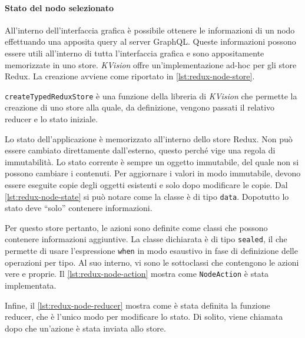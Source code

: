 \paragraph{Stato del nodo selezionato}
All'interno dell'interfaccia grafica è possibile ottenere le informazioni di un nodo effettuando una apposita query al server GraphQL. Queste informazioni possono essere utili all'interno di tutta l'interfaccia grafica e sono appositamente memorizzate in uno store. \textit{KVision} offre un'implementazione ad-hoc per gli store Redux. La creazione avviene come riportato in \cref{lst:redux-node-store}.

\texttt{createTypedReduxStore} è una funzione della libreria di \textit{KVision} che permette la creazione di uno store alla quale, da definizione, vengono passati il relativo reducer e lo stato iniziale.

Lo stato dell'applicazione è memorizzato all'interno dello store Redux. Non può essere cambiato direttamente dall'esterno, questo perché vige una regola di immutabilità. Lo stato corrente è sempre un oggetto immutabile, del quale non si possono cambiare i contenuti. Per aggiornare i valori in modo immutabile, devono essere eseguite copie degli oggetti esistenti e solo dopo modificare le copie. Dal \cref{lst:redux-node-state} si può notare come la classe è di tipo \texttt{data}. Dopotutto lo stato deve ``solo'' contenere informazioni.



Per questo store pertanto, le azioni sono definite come classi che possono contenere informazioni aggiuntive. La classe dichiarata è di tipo \texttt{sealed}, il che permette di usare l'espressione \texttt{when} in modo esaustivo in fase di definizione delle operazioni per tipo. Al suo interno, vi sono le sottoclassi che contengono le azioni vere e proprie. Il \cref{lst:redux-node-action} mostra come \texttt{NodeAction} è stata implementata.



Infine, il \cref{lst:redux-node-reducer} mostra come è stata definita la funzione reducer, che è l'unico modo per modificare lo stato. Di solito, viene chiamata dopo che un'azione è stata inviata allo store.

